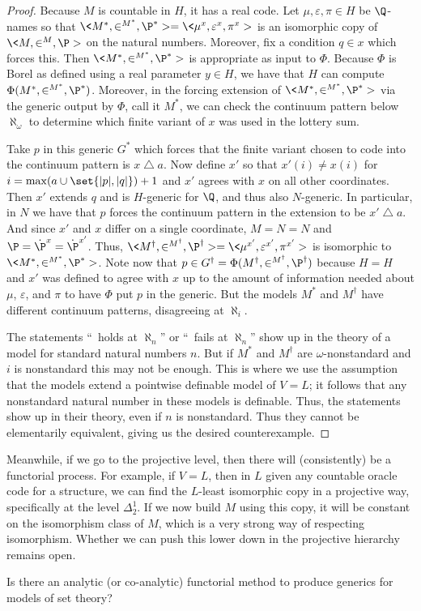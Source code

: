 \documentclass{amsart}
\begin{document}
\begin{proof}
 Because $M$ is countable in $H$, it has a real code. Let $\mu,\varepsilon,\pi \in H$ be $\Q$-names so that $\<M^*, \in^{M^*}, \P^*> = \<\mu^x,\varepsilon^x,\pi^x>$ is an isomorphic copy of $\<M,\in^M,\P>$ on the natural numbers. Moreover, fix a condition $q \in x$ which forces this. Then \hbox{$\<M^*, \in^{M^*}, \P^*>$} is appropriate as input to $\Phi$. Because $\Phi$ is Borel as defined using a real parameter $y \in H$, we have that $H$ can compute $\Phi(M^*, \in^{M^*}, \P^*)$. Moreover, in the forcing extension of $\<M^*, \in^{M^*}, \P^*>$ via the generic output by $\Phi$, call it $M^*$, we can check the continuum pattern below $\aleph_\omega$ to determine which finite variant of $x$ was used in the lottery sum.
 
 Take $p$ in this generic $G^*$ which forces that the finite variant chosen to code into the continuum pattern is $x \mathbin{\triangle} a$.  Now define $x'$ so that $x'(i) \ne x(i)$ for $i = \max(a \cup \set{\lvert p \rvert, \lvert q \rvert})+1$ and $x'$ agrees with $x$ on all other coordinates. Then $x'$ extends $q$ and is $H$-generic for $\Q$, and thus also $N$-generic. In particular, in $N$ we have that $p$ forces the continuum pattern in the extension to be $x' \mathbin{\triangle} a$.
 And since $x'$ and $x$ differ on a single coordinate, $M = N = N$ and $\P = \dot \P^x = \dot \P^{x'}$. Thus, $\<M^\dagger,\in^{M^\dagger}, \P^\dagger> = \<\mu^{x'}, \varepsilon^{x'}, \pi^{x'}>$ is isomorphic to $\<M^*,\in^{M^*},\P^*>$. Note now that $p \in G^\dagger = \Phi(M^\dagger,\in^{M^\dagger}, \P^\dagger)$ because $H = H$ and $x'$ was defined to agree with $x$ up to the amount of information needed about $\mu$, $\varepsilon$, and $\pi$ to have $\Phi$ put $p$ in the generic. But the models $M^*$ and $M^\dagger$ have different continuum patterns, disagreeing at $\aleph_i$.
 
 The statements ``\GCH\ holds at $\aleph_n$'' or ``\GCH\ fails at $\aleph_n$'' show up in the theory of a model for standard natural numbers $n$. But if $M^*$ and $M^\dagger$ are $\omega$-nonstandard and $i$ is nonstandard this may not be enough. This is where we use the assumption that the models extend a pointwise definable model of $V=L$; it follows that any nonstandard natural number in these models is definable. Thus, the statements show up in their theory, even if $n$ is nonstandard. Thus they cannot be elementarily equivalent, giving us the desired counterexample.
 \end{proof}
 
 Meanwhile, if we go to the projective level, then there will (consistently) be a functorial process. For example, if $V=L$, then in $L$ given any countable oracle code for a structure, we can find the $L$-least isomorphic copy in a projective way, specifically at the level $\Delta^1_2$. If we now build $M$ using this copy, it will be constant on the isomorphism class of $M$, which is a very strong way of respecting isomorphism. Whether we can push this lower down in the projective hierarchy remains open.
 
 \begin{question}
 Is there an analytic (or co-analytic) functorial method to produce generics for models of set theory?
 \end{question}
 
 
 
 
 
 
 
 
 
 
\end{document}
